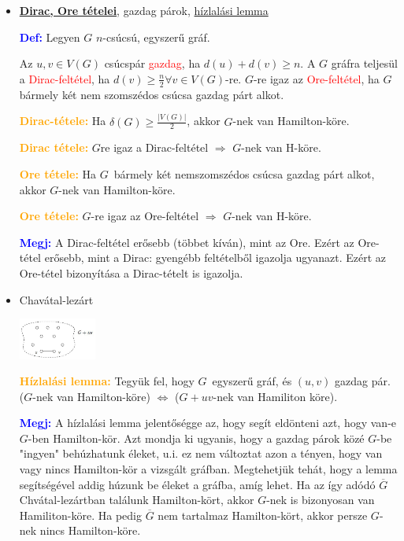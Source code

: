 \documentclass[../../szobeli.tex]{subfiles}
\begin{document}
\begin{itemize}
        \item \underline{\textbf{Dirac, Ore tételei}}, gazdag párok, \underline{hízlalási lemma}
        
            \textcolor{blue}{\textbf{Def:}} Legyen $G$ $n$-csúcsú, egyszerű gráf.

            Az $u,v \in V(G)$ csúcspár \textcolor{red}{gazdag}, ha $d(u) + d(v) \geq n$. A $G$ gráfra teljesül a \textcolor{red}{Dirac-feltétel}, ha $d(v) \geq \frac{n}{2} \forall v \in V(G)$-re. $G$-re igaz az \textcolor{red}{Ore-feltétel}, ha $G$ bármely két nem szomszédos csúcsa gazdag párt alkot.

            \textcolor{orange}{\textbf{Dirac-tétele:}} Ha $\delta(G) \geq \frac{|V(G)|}{2}$, akkor $G$-nek van Hamilton-köre.

            \textcolor{orange}{\textbf{Dirac tétele:}} $G$re igaz a Dirac-feltétel $\Rightarrow$ $G$-nek van H-köre.

            \textcolor{orange}{\textbf{Ore tétele:}} Ha $G$ bármely két nemszomszédos csúcsa gazdag párt alkot, akkor $G$-nek van Hamilton-köre.

            \textcolor{orange}{\textbf{Ore tétele:}} $G$-re igaz az Ore-feltétel $\Rightarrow$ $G$-nek van H-köre.

            \textcolor{blue}{\textbf{Megj:}} A Dirac-feltétel erősebb (többet kíván), mint az Ore. Ezért az Ore-tétel erősebb, mint a Dirac: gyengébb feltételből igazolja ugyanazt. Ezért az Ore-tétel bizonyítása a Dirac-tételt is igazolja.

        \item Chavátal-lezárt

            \includegraphics[width=0.2\textwidth]{./img/7.png}

            \textcolor{orange}{\textbf{Hízlalási lemma:}} Tegyük fel, hogy $G$ egyszerű gráf, és $(u,v)$ gazdag pár. ($G$-nek van Hamilton-köre) $\Longleftrightarrow$ ($G + uv$-nek van Hamiliton köre).

            \textcolor{blue}{\textbf{Megj:}} A hízlalási lemma jelentőségge az, hogy segít eldönteni azt, hogy van-e $G$-ben Hamilton-kör. Azt mondja ki ugyanis, hogy a gazdag párok közé $G$-be "ingyen" behúzhatunk éleket, u.i. ez nem változtat azon a tényen, hogy van vagy nincs Hamilton-kör a vizsgált gráfban. Megtehetjük tehát, hogy a lemma segítségével addig húzunk be éleket a gráfba, amíg lehet. Ha az így adódó $\overline{G}$ Chvátal-lezártban találunk Hamilton-kört, akkor $G$-nek is bizonyosan van Hamiliton-köre. Ha pedig $\overline{G}$ nem tartalmaz Hamilton-kört, akkor persze $G$-nek nincs Hamilton-köre.


\end{itemize}
\end{document}
